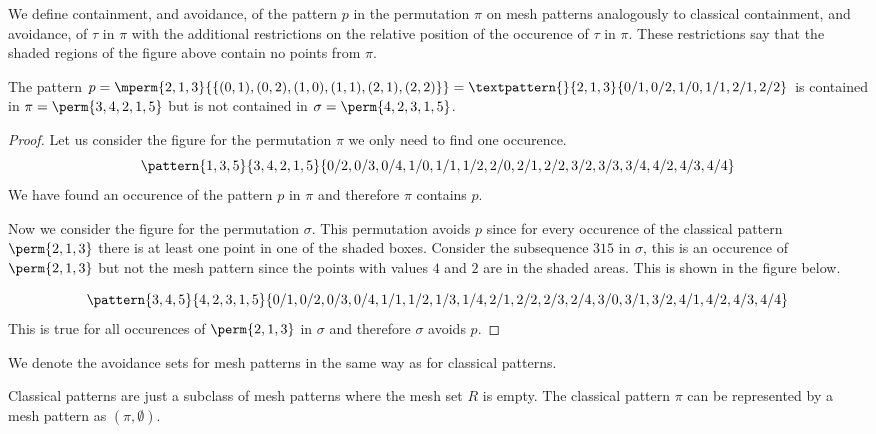We define containment, and avoidance, of the pattern \(p\) in the permutation
\(\pi\) on mesh patterns analogously to classical containment, and avoidance,
of \(\tau\) in \(\pi\) with the additional restrictions on the relative
position of the occurence of \(\tau\) in \(\pi\). These restrictions say that
the shaded regions of the figure above contain no points from \(\pi\).

\begin{example}
    The pattern \(p=\mperm{2,1,3}{\{(0,1),(0,2),(1,0),(1,1),(2,1),(2,2)\}}=
    \textpattern{}{ 2, 1, 3 }{ 0/1, 0/2, 1/0, 1/1, 2/1, 2/2 }\) is contained in
    \(\pi = \perm{3,4,2,1,5}\) but is not contained in \(\sigma = \perm{4,2,3,1,5}\).
\end{example}
\begin{proof}
    Let us consider the figure for the permutation \(\pi\) we only need to find one occurence.
    \begin{equation*}
        \pattern{1,3,5}{3,4,2,1,5}{0/2,0/3,0/4,
                                   1/0,1/1,1/2,
                                   2/0,2/1,2/2,
                                   3/2,3/3,3/4,
                                   4/2,4/3,4/4}
    \end{equation*}
    We have found an occurence of the pattern \(p\) in \(\pi\) and therefore
    \(\pi\) contains \(p\).

    Now we consider the figure for the permutation \(\sigma\). This permutation
    avoids \(p\) since for every occurence of the classical pattern \(\perm{2,1,3}\)
    there is at least one point in one of the shaded boxes. Consider the subsequence
    \(315\) in \(\sigma\), this is an occurence of \(\perm{2,1,3}\) but not the mesh
    pattern since the points with values \(4\) and \(2\) are in the shaded areas.
    This is shown in the figure below.

    \begin{equation*}
        \pattern{3,4,5}{4,2,3,1,5}{0/1,0/2,0/3,0/4,
                                   1/1,1/2,1/3,1/4,
                                   2/1,2/2,2/3,2/4,
                                   3/0,3/1,3/2,
                                   4/1,4/2,4/3,4/4}
    \end{equation*}
    This is true for all occurences of \(\perm{2,1,3}\) in \(\sigma\) and
    therefore \(\sigma\) avoids \(p\).
\end{proof}

We denote the avoidance sets for mesh patterns in the same way as for
classical patterns.

\begin{note}
    \label{not:classmesh}
    Classical patterns are just a subclass of mesh patterns where the mesh
    set \(R\) is empty. The classical pattern \(\pi\) can be represented
    by a mesh pattern as \((\pi,\emptyset)\).
\end{note}

